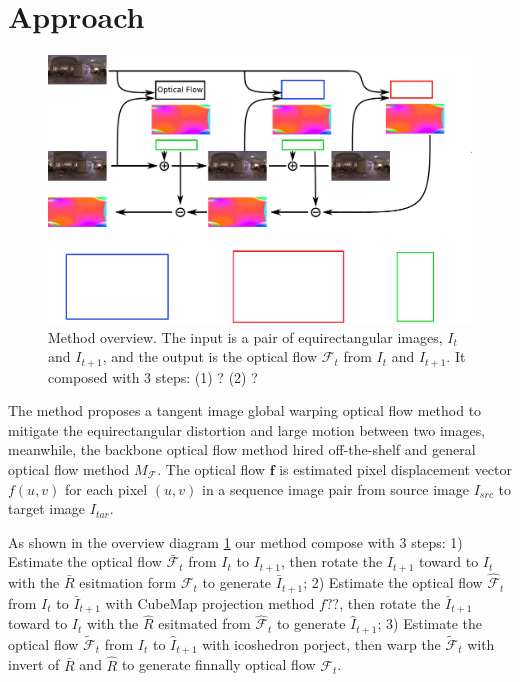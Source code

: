 \section{Approach}\label{sec:approach}

\begin{figure}[hbt!]
	\centering
	\includegraphics[width=0.95\linewidth]{images/method_pipeline_1.pdf}
	\caption{\label{fig:approach:pipeline}%
		Method overview.
		The input is a pair of equirectangular images, $I_t$ and $I_{t+1}$, and the output is the optical flow $\mathcal{F}_t$ from $I_t$ and $I_{t+1}$.
		It composed with 3 steps: (1) ? (2) ?}
\end{figure}

The method proposes a tangent image global warping optical flow method to mitigate the equirectangular distortion and large motion between two images, meanwhile, the backbone optical flow method hired off-the-shelf and general optical flow method $M_{\mathcal{F}}$.
The optical flow $\textbf{f}$ is estimated pixel displacement vector $f(u,v)$ for each pixel $(u,v)$ in a sequence image pair from source image $I_{src}$ to target image $I_{tar}$.

As shown in the overview diagram \cref{fig:approach:pipeline} our method compose with 3 steps:
1) Estimate the optical flow $\bar{\mathcal{F}}_t$ from $I_{t}$ to ${I_{t+1}}$, then rotate the $I_{t+1}$ toward to $I_{t}$ with the $\bar{R}$ esitmation form $\mathcal{F}_t$ to generate ${\bar{I}}_{t+1}$;
2) Estimate the optical flow ${\hat{\mathcal{F}}}_t$ from $I_{t}$ to ${\bar{I}}_{t+1}$ with CubeMap projection method $f??$, then rotate the  ${\bar{I}}_{t+1}$ toward to $I_t$ with the $\hat{R}$ esitmated from ${\hat{\mathcal{F}}}_t$ to generate ${\hat{I}}_{t+1}$;
3) Estimate the optical flow $\tilde{\mathcal{F}}_t$ from $I_{t}$ to ${\hat{I}}_{t+1}$ with icoshedron porject, then warp  the $\tilde{\mathcal{F}}_t$ with invert of $\bar{R}$ and $\hat{R}$ to generate finnally optical flow $\mathcal{F}_t$.

